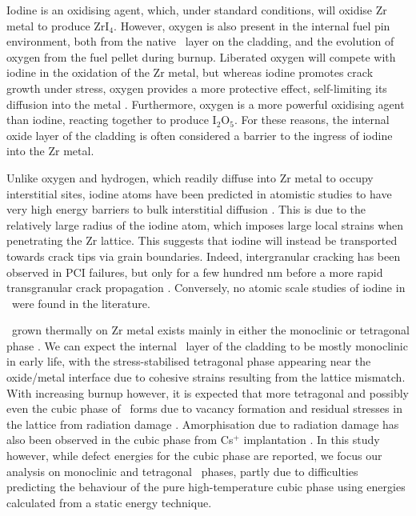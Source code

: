 

Iodine is an oxidising agent, which, under standard conditions, will oxidise Zr metal to produce ZrI$_{4}$. However, oxygen is also present in the internal fuel pin environment, both from the native \zirconia\ layer on the cladding, and the evolution of oxygen from the fuel pellet during burnup. Liberated oxygen will compete with iodine in the oxidation of the Zr metal, but whereas iodine promotes crack growth under stress, oxygen provides a more protective effect, self-limiting its diffusion into the metal \cite{farina2002stress, causey2005review}. Furthermore, oxygen is a more powerful oxidising agent than iodine, reacting together to produce I${_2}$O$_{5}$. For these reasons, the internal oxide layer of the cladding is often considered a barrier to the ingress of iodine into the Zr metal. 

Unlike oxygen and hydrogen, which readily diffuse into Zr metal to occupy interstitial sites, iodine atoms have been predicted in atomistic studies to have very high energy barriers to bulk interstitial diffusion \cite{rossi2015first,legris2005ab,carlot2002energetically}. This is due to the relatively large radius of the iodine atom, which imposes large local strains when penetrating the Zr lattice. This suggests that iodine will instead be transported towards crack tips via grain boundaries. Indeed, intergranular cracking has been observed in PCI failures, but only for a few hundred nm before a more rapid transgranular crack propagation \cite{fregonese2000failure}. Conversely, no atomic scale studies of iodine in \zirconia\ were found in the literature.  

\zirconia\ grown thermally on Zr metal exists mainly in either the monoclinic or tetragonal phase \cite{Howard1988,teufer1962crystal}. We can expect the internal \zirconia\ layer of the cladding to be mostly monoclinic in early life, with the stress-stabilised tetragonal phase appearing near the oxide/metal interface due to cohesive strains resulting from the lattice mismatch. With increasing burnup however, it is expected that more tetragonal and possibly even the cubic phase of \zirconia\ forms due to vacancy formation and residual stresses in the lattice from radiation damage \cite{sickafus1999radiation}. Amorphisation due to radiation damage has also been observed in the cubic phase from Cs$^{+}$ implantation \cite{amorphization2000wang}. In this study however, while defect energies for the cubic phase are reported, we focus our analysis on monoclinic and tetragonal \zirconia\ phases, partly due to difficulties predicting the behaviour of the pure high-temperature cubic phase using energies calculated from a static energy technique. 

